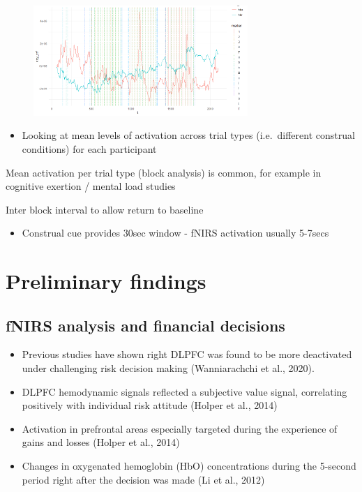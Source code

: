 \documentclass[
  letterpaper,
  DIV=11,
  numbers=noendperiod]{scrartcl}
\providecommand{\tightlist}{%
  \setlength{\itemsep}{0pt}\setlength{\parskip}{0pt}}\usepackage{longtable,booktabs,array}
\begin{document}
\begin{figure}[H]

{\centering \includegraphics[width=3.2in,height=\textheight]{img/oxyPlot.png}

}

\end{figure}

\begin{itemize}
\tightlist
\item
  Looking at mean levels of activation across trial types
  (i.e.~different construal conditions) for each participant
\end{itemize}

Mean activation per trial type (block analysis) is common, for example
in cognitive exertion / mental load studies

Inter block interval to allow return to baseline

\begin{itemize}
\tightlist
\item
  Construal cue provides 30sec window - fNIRS activation usually 5-7secs
\end{itemize}

\hypertarget{preliminary-findings}{%
\section{Preliminary findings}\label{preliminary-findings}}

\hypertarget{fnirs-analysis-and-financial-decisions}{%
\subsection{fNIRS analysis and financial
decisions}\label{fnirs-analysis-and-financial-decisions}}

\begin{itemize}
\item
  Previous studies have shown right DLPFC was found to be more
  deactivated under challenging risk decision making (Wanniarachchi et
  al., 2020).
\item
  DLPFC hemodynamic signals reflected a subjective value signal,
  correlating positively with individual risk attitude (Holper et al.,
  2014)
\item
  Activation in prefrontal areas especially targeted during the
  experience of gains and losses (Holper et al., 2014)
\item
  Changes in oxygenated hemoglobin (HbO) concentrations during the
  5-second period right after the decision was made (Li et al., 2012)
\end{itemize}
\end{document}

